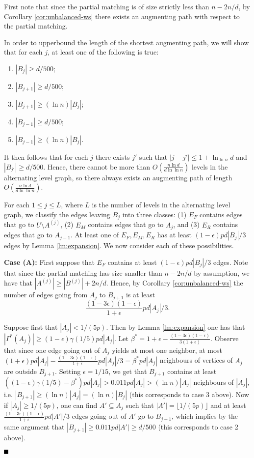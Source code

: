 \documentclass[11pt]{article}
\newcommand{\qed}{\mbox{}\hspace*{\fill}\nolinebreak\mbox{$\rule{0.6em}{0.6em}$}
}
\newcommand{\e}{{\epsilon}}
\newenvironment{proofof}[1]{\noindent{\bf Proof of #1:}}{$\qed$\par}
\begin{document}
\begin{proofof}{Lemma \ref{lm:main}}
First note that since the partial matching is of size strictly less than $n-2n/d$, by Corollary \ref{cor:unbalanced-ws} there exists an augmenting path with
 respect to the partial matching.

In order to upperbound the length of the shortest augmenting path, we will show that for each $j$, at least one of the following is true:  

\begin{enumerate}
\item $|B_j|\geq d/500$;
\item $|B_{j+1}|\geq d/500$;
\item $|B_{j+1}|\geq (\ln n)|B_{j}|$;
\item $|B_{j-1}|\geq d/500$; 
\item $|B_{j-1}|\geq (\ln n)|B_{j}|$.
\end{enumerate}

It then follows that for each $j$  there exists $j'$ such that $|j-j'|\leq 1+\ln_{\ln n} d$ and $|B_{j'}|\geq d/500$. Hence, there cannot be more than $O\left(\frac{n \ln d}{d \ln \ln n}\right)$ levels in the alternating level graph, so there always exists an augmenting path of length $O\left(\frac{n\ln d}{d\ln \ln n}\right)$.

For each $1\leq j\leq L$, where $L$ is the number of levels in the alternating level graph, we classify the edges leaving $B_j$ into three classes:
(1) $E_{F}$ contains edges that go to $U\setminus A^{(j)}$, (2) $E_M$ contains edges that go to $A_j$, and (3) $E_R$ contains edges that go to $A_{j-1}$.
At least one of $E_F, E_M, E_R$ has at least $(1-\e)p d|B_j|/3$ edges by Lemma \ref{lm:expansion}. We now consider each of these possibilities.

\textbf{Case (A):}
First suppose that $E_F$ contains at least
 $(1-\e)p d|B_j|/3$ edges. Note that since the partial matching has size smaller than $n-2n/d$ by assumption, we have that $|A^{(j)}|\geq |B^{(j)}|+2n/d$. Hence, by Corollary \ref{cor:unbalanced-ws} the number of edges going from $A_j$ to $B_{j+1}$ is at least 
\begin{equation*}
\frac{(1-3\e)(1-\e)}{1+\e} pd|A_j|/3.
\end{equation*}

Suppose first that $|A_j|<1/(5p)$. Then by Lemma \ref{lm:expansion} one has that $|\Gamma^*(A_j)|\geq (1-\e)\gamma(1/5) pd|A_j| $. Let $\beta^*=1+\e-\frac{(1-3\e)(1-\e)}{3(1+\e)}$. Observe that since one edge going out of $A_j$ yields at most one neighbor, at most $(1+\e)pd|A_j|-\frac{(1-3\e)(1-\e)}{1+\e} pd |A_j|/3=\beta^*pd |A_j|$ neighbours of vertices of $A_j$ are outside $B_{j+1}$.  Setting $\e=1/15$, we get that $B_{j+1}$ contains at least $((1-\e)\gamma(1/5)-\beta^*)pd |A_j|>0.011 pd |A_j|>(\ln n) |A_j|$ neighbours of $|A_{j}|$, i.e. $|B_{j+1}|\geq (\ln n) |A_j|=(\ln n) |B_j|$ (this corresponds to case 3 above). Now if $|A_j|\geq 1/(5p)$, one can find $A'\subseteq A_j$ such that $|A'|=\lfloor 1/(5p)\rfloor$ and at least $\frac{(1-3\e)(1-\e)}{1+\e} pd|A'|/3$ edges going out of $A'$ go to $B_{j+1}$, which implies by the same argument that $|B_{j+1}|\geq 0.011pd|A'|\geq d/500$ (this corresponds to case 2 above).


\end{proofof}
\end{document}
